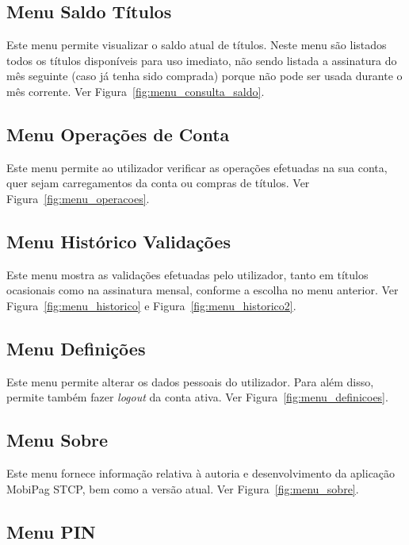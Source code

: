 \subsection{Menu Saldo Títulos}

Este menu permite visualizar o saldo atual de títulos. Neste menu são listados todos os títulos disponíveis para uso imediato, não sendo listada a assinatura do mês seguinte (caso já tenha sido comprada) porque não pode ser usada durante o mês corrente. Ver Figura~\ref{fig:menu_consulta_saldo}.

\subsection{Menu Operações de Conta}

Este menu permite ao utilizador verificar as operações efetuadas na sua conta, quer sejam carregamentos da conta ou compras de títulos. Ver Figura~\ref{fig:menu_operacoes}.

\subsection{Menu Histórico Validações}

Este menu mostra as validações efetuadas pelo utilizador, tanto em títulos ocasionais como na assinatura mensal, conforme a escolha no menu anterior. Ver Figura~\ref{fig:menu_historico} e Figura~\ref{fig:menu_historico2}.

\subsection{Menu Definições}

Este menu permite alterar os dados pessoais do utilizador. Para além disso, permite também fazer \emph{logout} da conta ativa. Ver Figura~\ref{fig:menu_definicoes}.

\subsection{Menu Sobre}

Este menu fornece informação relativa à autoria e desenvolvimento da aplicação MobiPag STCP, bem como a versão atual. Ver Figura~\ref{fig:menu_sobre}.

\subsection{Menu PIN}

